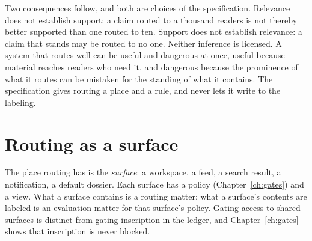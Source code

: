 Two consequences follow, and both are choices of the specification. Relevance does not establish support: a claim routed to a thousand readers is not thereby better supported than one routed to ten. Support does not establish relevance: a claim that stands may be routed to no one. Neither inference is licensed. A system that routes well can be useful and dangerous at once, useful because material reaches readers who need it, and dangerous because the prominence of what it routes can be mistaken for the standing of what it contains. The specification gives routing a place and a rule, and never lets it write to the labeling.

\section{Routing as a surface}\label{sec:surface}

The place routing has is the \emph{surface}: a workspace, a feed, a search result, a notification, a default dossier. Each surface has a policy (Chapter~\ref{ch:gates}) and a view. What a surface contains is a routing matter; what a surface's contents are labeled is an evaluation matter for that surface's policy. Gating access to shared surfaces is distinct from gating inscription in the ledger, and Chapter~\ref{ch:gates} shows that inscription is never blocked.
